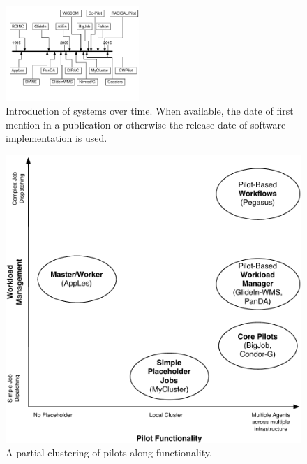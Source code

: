 \documentclass{sig-alternate}
\begin{document}


\begin{figure}[t]
  \centering
    \includegraphics[width=0.45\textwidth]{figures/timeline}
    \caption{Introduction of systems over time. When available, the date of
      first mention in a publication or otherwise the release date of software
      implementation is used.  }
    \label{fig:timeline}
\end{figure}


\begin{figure}[t]
  \centering
    \includegraphics[width=.45\textwidth]{figures/pilotjob-clustering.pdf}
    \caption{A partial clustering of pilots along functionality.  }
  \label{fig:pilotjob_clustering}
\end{figure}
\end{document}

